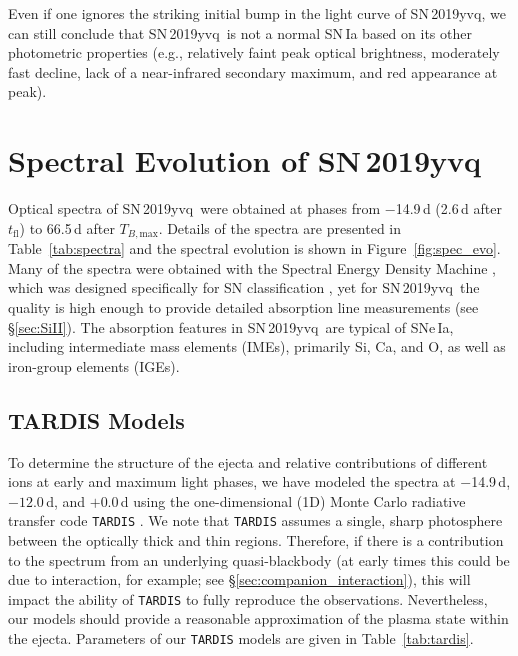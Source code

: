 \documentclass[twocolumn]{aastex63}
\newcommand{\tfl}{$t_\mathrm{fl}$}
\newcommand{\tbmax}{$T_{B,\mathrm{max}}$}
\newcommand{\sn}{SN\,2019yvq}
\begin{document}
Even if one ignores the striking initial bump in the light curve of \sn, we
can still conclude that \sn\ is not a normal SN\,Ia based on its other
photometric properties (e.g., relatively faint peak optical brightness,
moderately fast decline, lack of a near-infrared secondary maximum, and red
appearance at peak).

\section{Spectral Evolution of \sn}\label{sec:spec}

Optical spectra of \sn\ were obtained at phases from $-$14.9\,d (2.6\,d after
\tfl) to 66.5\,d after \tbmax. Details of the spectra are presented in
Table~\ref{tab:spectra} and the spectral evolution is shown in
Figure~\ref{fig:spec_evo}. Many of the spectra were obtained with the Spectral
Energy Density Machine \citep[SEDM;][]{Blagorodnova18,Rigault19}, which was
designed specifically for SN classification \citep[e.g.,][]{Fremling19a}, yet
for \sn\ the quality is high enough to provide detailed absorption line
measurements (see \S\ref{sec:SiII}). The absorption features in \sn\ are
typical of SNe\,Ia, including intermediate mass elements (IMEs), primarily Si,
Ca, and O, as well as iron-group elements (IGEs).

\subsection{TARDIS Models}\label{sec:tardis}

To determine the structure of the ejecta and relative contributions of
different ions at early and maximum light phases, we have modeled the spectra
at $-$14.9\,d, $-12.0$\,d, and $+$0.0\,d using the one-dimensional (1D) Monte
Carlo radiative transfer code \texttt{TARDIS} \citep{Kerzendorf14}. We note
that \texttt{TARDIS} assumes a single, sharp photosphere between the optically
thick and thin regions. Therefore, if there is a contribution to the spectrum
from an underlying quasi-blackbody (at early times this could be due to
interaction, for example; see \S\ref{sec:companion_interaction}), this will
impact the ability of \texttt{TARDIS} to fully reproduce the observations.
Nevertheless, our models should provide a reasonable approximation of the
plasma state within the ejecta. Parameters of our \texttt{TARDIS} models are
given in Table~\ref{tab:tardis}.


\end{document}
